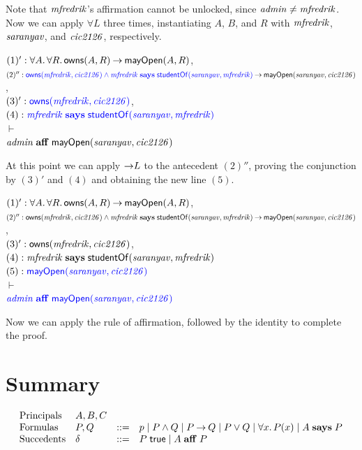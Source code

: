 \documentclass[11pt]{article}
\begin{document}
Note that $\mathit{mfredrik}$'s affirmation cannot be unlocked, since
$\mathit{admin} \neq \mathit{mfredrik}$.  Now we can apply ${\forall}L$ three times, instantiating
$A$, $B$, and $R$ with $\mathit{mfredrik}$, $\mathit{saranyav}$, and $\mathit{cic2126}$, respectively.
\begin{tabbing}
  \quad $(1)' : \forall A.\, \forall R.\, \mathsf{owns}(A, R) \mathbin{\rightarrow} \mathsf{mayOpen}(A, R)$, \\
  \quad $(2)'' : {\color{blue}\mathsf{owns}(\mathit{mfredrik}, \mathit{cic2126})
  \land \mathit{mfredrik} \mathrel{\mathbf{says}} \mathsf{studentOf}(\mathit{saranyav}, \mathit{mfredrik})} \mathbin{\rightarrow} \mathsf{mayOpen}(\mathit{saranyav}, \mathit{cic2126})$, \\[1ex]
  \quad $(3)' : {\color{blue}\mathsf{owns}(\mathit{mfredrik}, \mathit{cic2126})}$, \\
  \quad $(4) : {\color{blue}\mathit{mfredrik} \mathrel{\mathbf{says}} \mathsf{studentOf}(\mathit{saranyav}, \mathit{mfredrik})}$ \\[1ex]
  \quad $\vdash$ \\[1ex]
  \quad $\mathit{admin} \mathrel{\mathbf{aff}} \mathsf{mayOpen}(\mathit{saranyav}, \mathit{cic2126})$
\end{tabbing}
At this point we can apply ${\mathbin{\rightarrow}}L$ to the antecedent $(2)''$, proving
the conjunction by $(3)'$ and $(4)$ and obtaining the new line $(5)$.
\begin{tabbing}
  \quad $(1)' : \forall A.\, \forall R.\, \mathsf{owns}(A, R) \mathbin{\rightarrow} \mathsf{mayOpen}(A, R)$, \\
  \quad $(2)'' : \mathsf{owns}(\mathit{mfredrik}, \mathit{cic2126})
  \land \mathit{mfredrik} \mathrel{\mathbf{says}} \mathsf{studentOf}(\mathit{saranyav}, \mathit{mfredrik}) \mathbin{\rightarrow} \mathsf{mayOpen}(\mathit{saranyav}, \mathit{cic2126})$, \\[1ex]
  \quad $(3)' : \mathsf{owns}(\mathit{mfredrik}, \mathit{cic2126})$, \\
  \quad $(4) : \mathit{mfredrik} \mathrel{\mathbf{says}} \mathsf{studentOf}(\mathit{saranyav}, \mathit{mfredrik})$ \\
  \quad $(5) : {\color{blue}\mathsf{mayOpen}(\mathit{saranyav}, \mathit{cic2126})}$ \\[1ex]
  \quad $\vdash$ \\[1ex]
  \quad ${\color{blue}\mathit{admin} \mathrel{\mathbf{aff}} \mathsf{mayOpen}(\mathit{saranyav}, \mathit{cic2126})}$
\end{tabbing}
Now we can apply the rule of affirmation, followed by the identity to complete
the proof.

\section{Summary}

\[
  \begin{array}{llcl}
    \mbox{Principals} & A, B, C \\
    \mbox{Formulas} & P, Q & ::= & p \mid P \land Q \mid P \mathbin{\rightarrow} Q \mid P \lor Q \mid \forall x.\, P(x) \mid A \mathrel{\mathbf{says}} P \\
    \mbox{Succedents} & \delta & ::= & P\; \mathsf{true} \mid A \mathrel{\mathbf{aff}} P
  \end{array}
\]
\end{document}
